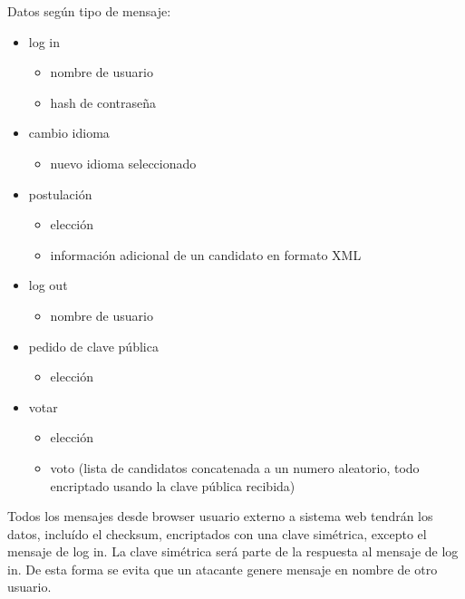 Datos según tipo de mensaje:
\begin{itemize}
 \item log in


  \begin{itemize}
    \item nombre de usuario
    \item hash de contraseña
  \end{itemize}
  \item cambio idioma
  

  \begin{itemize}
    \item nuevo idioma seleccionado
  \end{itemize}
  \item postulación
  
  \begin{itemize}
    \item elección
    \item información adicional de un candidato en formato XML
  \end{itemize}
  \item log out
  
  \begin{itemize}
    \item nombre de usuario
  \end{itemize}
  \item pedido de clave pública
  
  \begin{itemize}
    \item elección
  \end{itemize}
  \item votar
  
  \begin{itemize}
    \item elección
    \item voto (lista de candidatos concatenada a un 
			numero aleatorio, todo encriptado usando la clave pública recibida)
  \end{itemize}
\end{itemize}



Todos los mensajes desde browser usuario externo a sistema web tendrán los datos, incluído el checksum, encriptados con una clave simétrica, excepto el mensaje de log in. La clave simétrica será parte de la respuesta al mensaje de log in. De esta forma se evita que un atacante genere mensaje en nombre de otro usuario.

